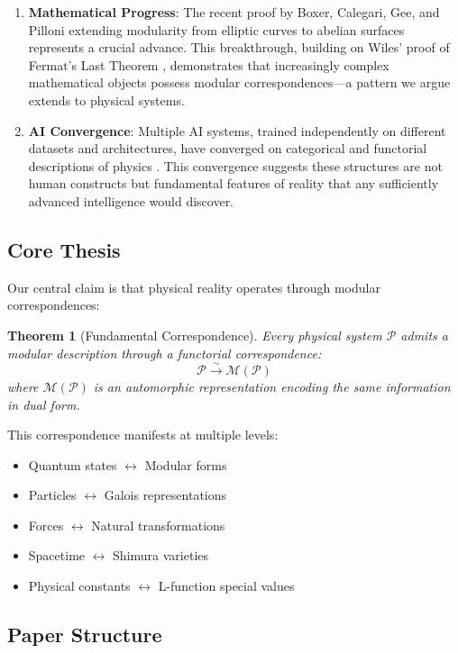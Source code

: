 \documentclass[12pt,a4paper]{article}
\newtheorem{theorem}{Theorem}[section]
\begin{document}
\begin{enumerate}
\item \textbf{Mathematical Progress}: The recent proof by Boxer, Calegari, Gee, and Pilloni \cite{BCGP2025} extending modularity from elliptic curves to abelian surfaces represents a crucial advance. This breakthrough, building on Wiles' proof of Fermat's Last Theorem \cite{Wiles1995}, demonstrates that increasingly complex mathematical objects possess modular correspondences---a pattern we argue extends to physical systems.

\item \textbf{AI Convergence}: Multiple AI systems, trained independently on different datasets and architectures, have converged on categorical and functorial descriptions of physics \cite{LongClaude2025}. This convergence suggests these structures are not human constructs but fundamental features of reality that any sufficiently advanced intelligence would discover.
\end{enumerate}

\subsection{Core Thesis}

Our central claim is that physical reality operates through modular correspondences:

\begin{theorem}[Fundamental Correspondence]
Every physical system $\mathcal{P}$ admits a modular description through a functorial correspondence:
\[
\mathcal{P} \overset{\sim}{\longrightarrow} \mathcal{M}(\mathcal{P})
\]
where $\mathcal{M}(\mathcal{P})$ is an automorphic representation encoding the same information in dual form.
\end{theorem}

This correspondence manifests at multiple levels:
\begin{itemize}
\item Quantum states $\leftrightarrow$ Modular forms
\item Particles $\leftrightarrow$ Galois representations  
\item Forces $\leftrightarrow$ Natural transformations
\item Spacetime $\leftrightarrow$ Shimura varieties
\item Physical constants $\leftrightarrow$ L-function special values
\end{itemize}

\subsection{Paper Structure}
\end{document}
